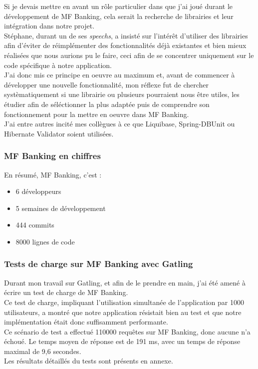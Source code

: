 Si je devais mettre en avant un rôle particulier dans que j'ai joué durant le développement de MF Banking, cela serait la recherche de librairies et leur intégration dans notre projet.\\
Stéphane, durant un de ses \textit{speechs}, a insisté sur l'intérêt d'utiliser des librairies afin d'éviter de réimplémenter des fonctionnalités déjà existantes et bien mieux réalisées que nous aurions pu le faire, ceci afin de se concentrer uniquement sur le code spécifique à notre application.\\
J'ai donc mis ce principe en oeuvre au maximum et, avant de commencer à développer une nouvelle fonctionnalité, mon réflexe fut de chercher systèmatiquement si une librairie  ou plusieurs pourraient nous être utiles, les étudier afin de séléctionner la plus adaptée puis de comprendre son fonctionnement pour la mettre en oeuvre dans MF Banking.\\
J'ai entre autres incité mes collègues à ce que Liquibase, Spring-DBUnit ou Hibernate Validator soient utilisées. 
\subsubsection{MF Banking en chiffres}

En résumé, MF Banking, c'est : 
\begin{itemize}
	\item 6 développeurs
	\item 5 semaines de développement
	\item 444 commits
	\item 8000 lignes de code
\end{itemize}

\subsubsection{Tests de charge sur MF Banking avec Gatling}

Durant mon travail sur Gatling, et afin de le prendre en main, j'ai été amené à écrire un test de charge de MF Banking.\\
Ce test de charge, impliquant l'utilisation simultanée de l'application par 1000 utilisateurs, a montré que notre application résistait bien au test et que notre implémentation était donc suffisamment performante.\\
Ce scénario de test a effectué 110000 requêtes sur MF Banking, donc aucune n'a échoué. Le temps moyen de réponse est de 191 ms, avec un temps de réponse maximal de 9,6 secondes.\\
Les résultats détaillés du tests sont présents en annexe.

